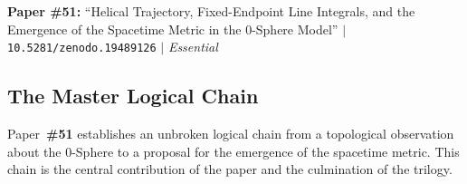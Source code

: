 \documentclass[12pt,letterpaper]{article}
\newcommand{\doilink}[1]{\texttt{#1}}
\newcommand{\paperno}[1]{\textbf{\#{}#1}}
\begin{document}
\begin{mdframed}[style=purplebox]
\textbf{\textcolor{threadpurple}{Paper \#51:}}
``Helical Trajectory, Fixed-Endpoint Line Integrals, and the Emergence of the
Spacetime Metric in the 0-Sphere Model'' $|$ \doilink{10.5281/zenodo.19489126} $|$ \textit{Essential}
\end{mdframed}

\subsection{The Master Logical Chain}
\label{subsec:master_chain}

Paper~\paperno{51} establishes an unbroken logical chain from a topological
observation about the 0-Sphere to a proposal for the emergence of the spacetime metric.
This chain is the central contribution of the paper and the culmination of the trilogy.
\end{document}
